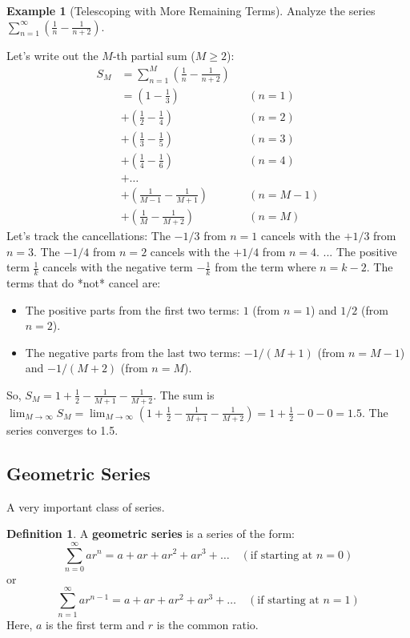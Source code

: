 \documentclass[11pt]{article}
\theoremstyle{definition}
\newtheorem{definition}[theorem]{Definition}
\newtheorem{example}[theorem]{Example}
\theoremstyle{remark}
\begin{document}
\begin{example}[Telescoping with More Remaining Terms] \label{ex:telescope_n+2}
Analyze the series $\sum_{n=1}^\infty \left(\frac{1}{n} - \frac{1}{n+2}\right)$.

Let's write out the $M$-th partial sum ($M \ge 2$):
\begin{align*} S_M &= \sum_{n=1}^M \left(\frac{1}{n} - \frac{1}{n+2}\right) \\ &= \left(1 - \frac{1}{3}\right) && (n=1) \\ &+ \left(\frac{1}{2} - \frac{1}{4}\right) && (n=2) \\ &+ \left(\frac{1}{3} - \frac{1}{5}\right) && (n=3) \\ &+ \left(\frac{1}{4} - \frac{1}{6}\right) && (n=4) \\ &+ \dots \\ &+ \left(\frac{1}{M-1} - \frac{1}{M+1}\right) && (n=M-1) \\ &+ \left(\frac{1}{M} - \frac{1}{M+2}\right) && (n=M) \end{align*}
Let's track the cancellations:
The $-1/3$ from $n=1$ cancels with the $+1/3$ from $n=3$.
The $-1/4$ from $n=2$ cancels with the $+1/4$ from $n=4$.
...
The positive term $\frac{1}{k}$ cancels with the negative term $-\frac{1}{k}$ from the term where $n = k-2$.
The terms that do *not* cancel are:
\begin{itemize}
    \item The positive parts from the first two terms: $1$ (from $n=1$) and $1/2$ (from $n=2$).
    \item The negative parts from the last two terms: $-1/(M+1)$ (from $n=M-1$) and $-1/(M+2)$ (from $n=M$).
\end{itemize}
So, $S_M = 1 + \frac{1}{2} - \frac{1}{M+1} - \frac{1}{M+2}$.
The sum is $\lim_{M\to\infty} S_M = \lim_{M\to\infty} \left(1 + \frac{1}{2} - \frac{1}{M+1} - \frac{1}{M+2}\right) = 1 + \frac{1}{2} - 0 - 0 = 1.5$.
The series converges to 1.5.
\end{example}

\subsection{Geometric Series}

A very important class of series.

\begin{definition}
A \textbf{geometric series} is a series of the form:
\[ \sum_{n=0}^\infty ar^n = a + ar + ar^2 + ar^3 + \dots \quad (\text{if starting at } n=0) \]
or
\[ \sum_{n=1}^\infty ar^{n-1} = a + ar + ar^2 + ar^3 + \dots \quad (\text{if starting at } n=1) \]
Here, $a$ is the first term and $r$ is the common ratio.
\end{definition}
\end{document}
